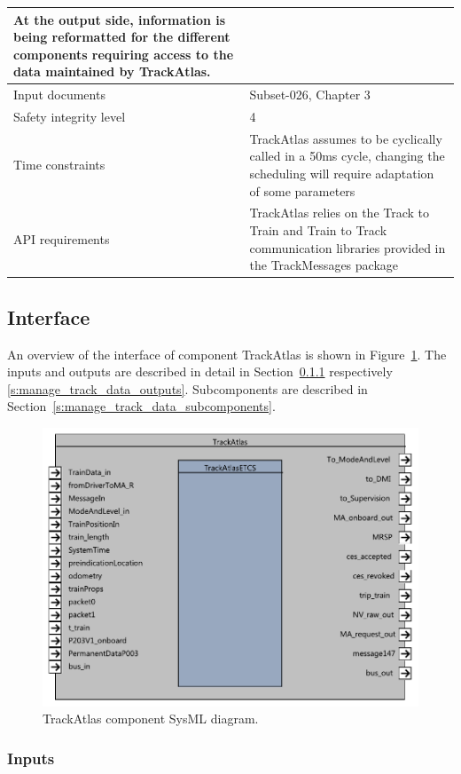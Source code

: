 \begin{longtable}{p{}p{}}
At the output side, information is being reformatted for the different components requiring access to the data maintained by TrackAtlas.
 \\
\midrule
Input documents	& 
Subset-026, Chapter 3\\
\midrule
Safety integrity level	& 4 \\
\midrule
Time constraints		& TrackAtlas assumes to be cyclically called in a 50ms cycle, changing the scheduling will require adaptation of some parameters \\
\midrule
API requirements 		& TrackAtlas relies on the Track to Train and Train to Track communication libraries provided in the TrackMessages package \\
\bottomrule
\end{longtable}


\subsection{Interface}

An overview of the interface of component TrackAtlas is shown in Figure~\ref{f:manage_track_data_interface}. The inputs and outputs are described in detail in Section~\ref{s:manage_track_data_inputs} respectively \ref{s:manage_track_data_outputs}. Subcomponents are described in Section~\ref{s:manage_track_data_subcomponents}.

\begin{figure}
\center
\includegraphics[width=.8\textwidth]{images/F2_4_TrackAtlas.pdf}
\caption{TrackAtlas component SysML diagram.}\label{f:manage_track_data_interface}
\end{figure}


\subsubsection{Inputs}\label{s:manage_track_data_inputs}

